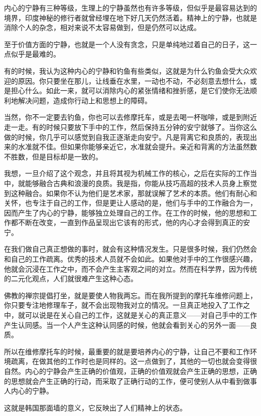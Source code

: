 \documentclass[UTF8]{article}
\begin{document}
\par 内心的宁静有三种等级，生理上的宁静虽然也有许多等级，但似乎是最容易达到的境界，印度神秘的修行者就曾经埋在地下好几天仍然活着。精神上的宁静，也就是消除个人的杂念，相对来说不太容易做到，但是仍然可以达成。
\par 至于价值方面的宁静，也就是一个人没有贪念，只是单纯地过着自己的日子，这一点似乎是最难的。
\par 有的时候，我认为这种内心的宁静和钓鱼有些类似，这就是为什么钓鱼会受大众欢迎的原因。你只要坐在那儿，让线垂在水里，一动也不动，不必刻意去想什么，或是担心什么。如此一来，就可以消除内心的紧张情绪和挫折感，是它们使你无法顺利地解决问题，造成你行动上和思想上的障碍。
\par 当然，你不一定要去钓鱼，你也可以去修摩托车，或是去喝一杯咖啡，或是到附近走一走。有的时候只要放下手中的工作，然后保持五分钟的安宁就够了。当你这么做的时候，你几乎可以感觉到自我正逐渐走向安宁。凡是背离它和良质的，表现出来的水准就不佳。但如果你能够亲近它，水准就会提升。亲近和背离的方法虽然数不胜数，但是目标却是一致的。
\par 我想，一旦介绍了这个观念，并且将其视为机械工作的核心，之后在实际的工作当中，就能够融合古典和浪漫的良质。我是指，你能从技巧高超的技术人员身上察觉到这种融合。如果你不认为他们是艺术家，那就误解了艺术的本质。他们有耐心和关怀，也专注于自己的工作，但是更让人感动的是，他们与手中的工作融合为一，因而产生了内心的宁静，能够独立处理自己的工作。在工作的时候，他的思想和工作都不断在改变，一直到作品呈现出它该有的形式，他的内心才会得到真正的安宁。
\par 在我们做自己真正想做的事时，就会有这种情况发生。只是很多时候，我们仍然会和自己的工作疏离。优秀的技术人员就不会如此。如果他对手中的工作很感兴趣，他就会沉浸在工作之中，而不会产生主客观之间的对立。然而在科学界，因为传统的二元化观点，人们就很难产生这种心态。
\par 佛教的禅宗提倡打坐，就是要使人物我两忘。而在我所提到的摩托车维修问题上，你只要专注地修理车子，就不会出现物我对立的情况。一旦真正地投入了工作之中，就可以说是在关心自己的工作，这就是关心的真正意义——对自己手中的工作产生认同感。当一个人产生这种认同感的时候，他就会看到关心的另外一面——良质。
\par 所以在维修摩托车的时候，最重要的就是要培养内心的宁静，让自己不要和工作环境疏离，在做其他的工作时也是同样的。这一点做到了，其他的一切也就会变得很自然。内心的宁静会产生正确的价值观，正确的价值观就会产生正确的思想，正确的思想就会产生正确的行动，而采取了正确行动的工作，便可使别人从中看到做事人内心的宁静。
\par 这就是韩国那面墙的意义，它反映出了人们精神上的状态。
\end{document}
